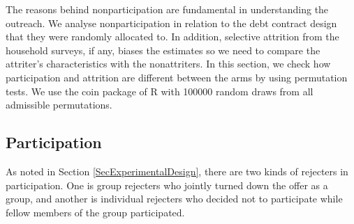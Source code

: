 	The reasons behind nonparticipation are fundamental in understanding the outreach. We analyse nonparticipation in relation to the debt contract design that they were randomly allocated to. In addition, selective attrition from the household surveys, if any, biases the estimates so we need to compare the attriter's characteristics with the nonattriters. In this section, we check how participation and attrition are different between the arms by using permutation tests. We use the \textsf{coin} package of \textsf{R} with 100000 random draws from all admissible permutations. 


\subsection{Participation}
\label{ResultsSectionParticipation}


	As noted in Section \ref{SecExperimentalDesign}, there are two kinds of rejecters in participation. One is group rejecters who jointly turned down the offer as a group, and another is individual rejecters who decided not to participate while fellow members of the group participated. 

